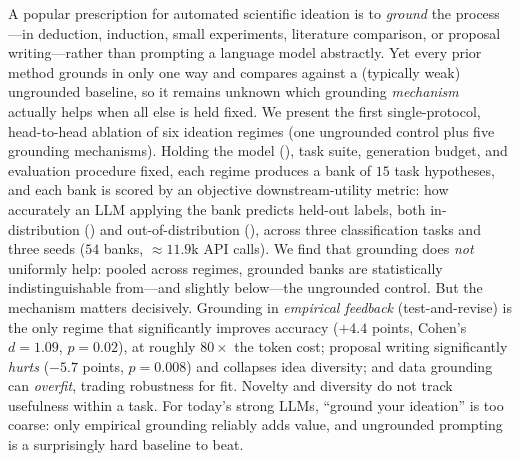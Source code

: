 A popular prescription for automated scientific ideation is to \emph{ground} the
process---in deduction, induction, small experiments, literature comparison, or
proposal writing---rather than prompting a language model abstractly. Yet every
prior method grounds in only one way and compares against a (typically weak)
ungrounded baseline, so it remains unknown which grounding \emph{mechanism}
actually helps when all else is held fixed. We present the first single-protocol,
head-to-head ablation of six ideation regimes (one ungrounded control plus five
grounding mechanisms). Holding the model (\gptmini), task suite, generation
budget, and evaluation procedure fixed, each regime produces a bank of $15$ task
hypotheses, and each bank is scored by an objective downstream-utility metric: how
accurately an LLM applying the bank predicts held-out labels, both in-distribution
(\IND) and out-of-distribution (\OOD), across three classification tasks and three
seeds ($54$ banks, $\approx 11.9$k API calls). We find that grounding does
\emph{not} uniformly help: pooled across regimes, grounded banks are statistically
indistinguishable from---and slightly below---the ungrounded control. But the
mechanism matters decisively. Grounding in \emph{empirical feedback}
(test-and-revise) is the only regime that significantly improves \IND{} accuracy
($+4.4$ points, Cohen's $d=1.09$, $p=0.02$), at roughly $80\times$ the token cost;
proposal writing significantly \emph{hurts} ($-5.7$ points, $p=0.008$) and
collapses idea diversity; and data grounding can \emph{overfit}, trading \OOD{}
robustness for \IND{} fit. Novelty and diversity do not track usefulness within a
task. For today's strong LLMs, ``ground your ideation'' is too coarse: only
empirical grounding reliably adds value, and ungrounded prompting is a
surprisingly hard baseline to beat.
